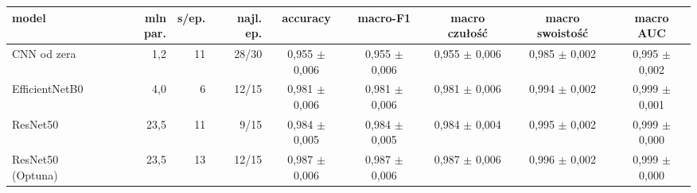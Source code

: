 \begin{tabular}{lrrrccccc}
\toprule
model & mln par. & s/ep. & najl. ep. & accuracy & macro-F1 & macro czułość & macro swoistość & macro AUC \\
\midrule
CNN od zera & 1,2 & 11 & 28/30 & 0,955 $\pm$ 0,006 & 0,955 $\pm$ 0,006 & 0,955 $\pm$ 0,006 & 0,985 $\pm$ 0,002 & 0,995 $\pm$ 0,002 \\
EfficientNetB0 & 4,0 & 6 & 12/15 & 0,981 $\pm$ 0,006 & 0,981 $\pm$ 0,006 & 0,981 $\pm$ 0,006 & 0,994 $\pm$ 0,002 & 0,999 $\pm$ 0,001 \\
ResNet50 & 23,5 & 11 & 9/15 & 0,984 $\pm$ 0,005 & 0,984 $\pm$ 0,005 & 0,984 $\pm$ 0,004 & 0,995 $\pm$ 0,002 & 0,999 $\pm$ 0,000 \\
ResNet50 (Optuna) & 23,5 & 13 & 12/15 & 0,987 $\pm$ 0,006 & 0,987 $\pm$ 0,006 & 0,987 $\pm$ 0,006 & 0,996 $\pm$ 0,002 & 0,999 $\pm$ 0,000 \\
\bottomrule
\end{tabular}
